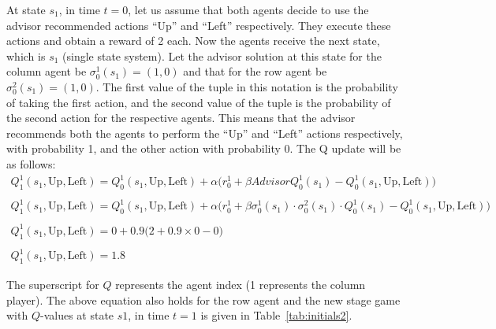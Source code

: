 \documentclass[jair, twoside,11pt,theapa]{article}
\begin{document}
At state $s_1$, in time $t=0$, let us assume that both agents decide to use the advisor recommended actions ``Up'' and ``Left''  respectively. They execute these actions and obtain a reward of 2 each. Now the agents receive the next state, which is $s_1$ (single state system). Let the advisor solution at this state for the column agent be $\sigma^{1}_0(s_1) = (1, 0)$ and that for the row agent be $\sigma^{2}_0(s_1) = (1, 0)$. The first value of the tuple in this notation is the probability of taking the first action, and the second value of the tuple is the probability of the second action for the respective agents. This means that the advisor recommends both the agents to perform the ``Up'' and ``Left'' actions respectively, with probability 1, and the other action with probability 0. The Q update will be as follows: 
\begin{equation}
    \begin{array}{l}
Q^{1}_1(s_1, \textrm{Up}, \textrm{Left}) =  Q^{1}_0(s_1, \textrm{Up}, \textrm{Left})   +  \alpha \Big(r^{1}_0 + \beta AdvisorQ^{1}_0(s_1) - Q^{1}_0(s_1, \textrm{Up}, \textrm{Left}) \Big)
\\ \\ 
Q^{1}_1(s_1, \textrm{Up}, \textrm{Left}) = Q^{1}_0(s_1, \textrm{Up}, \textrm{Left})  +  \alpha \Big(r^{1}_0 + \beta \sigma^1_0(s_1) \cdot \sigma^2_0(s_1) \cdot Q^1_0(s_1) - Q^{1}_0(s_1, \textrm{Up}, \textrm{Left}) \Big)
\\ \\
Q^{1}_1(s_1, \textrm{Up},\textrm{Left}) =  0 + 0.9 \Big(2 + 0.9 \times 0 - 0 \Big)
\\ \\ 
Q^{1}_1(s_1, \textrm{Up}, \textrm{Left}) =  1.8
    \end{array}
\end{equation}

The superscript for $Q$ represents the agent index (1 represents the column player). The above equation also holds for the row agent and the new stage game with $Q$-values at state $s1$, in time $t = 1$ is given in Table~\ref{tab:initials2}. 
\end{document}
